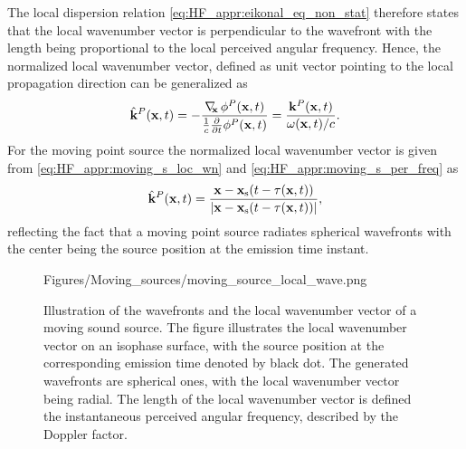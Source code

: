 The local dispersion relation \eqref{eq:HF_appr:eikonal_eq_non_stat} therefore states that the local wavenumber vector is perpendicular to the wavefront with the length being proportional to the local perceived angular frequency.
Hence, the normalized local wavenumber vector, defined as unit vector pointing to the local propagation direction can be generalized as
\begin{equation}
\label{eq:Moving_source:local_wn_general}
\hat{\mathbf{k}}^P(\mathbf{x},t) = -\frac{\nabla_{\!\!\mathbf{x}}\, \phi^P(\mathbf{x},t)}{\frac{1}{c}\frac{\partial}{\partial t} \phi^P(\mathbf{x},t)}  = \frac{\mathbf{k}^P(\mathbf{x},t)}{ \omega(\mathbf{x},t)/c }.
\end{equation}
For the moving point source the normalized local wavenumber vector is given from \eqref{eq:HF_appr:moving_s_loc_wn} and \eqref{eq:HF_appr:moving_s_per_freq} as
\begin{equation}
\label{eq:Moving_source:norm_local_wn_moving_source}
\hat{\mathbf{k}}^P(\mathbf{x},t) = \frac{\mathbf{x} -\mathbf{x}_{\mathrm{s}}(t-\tau(\mathbf{x},t))}{|\mathbf{x}-\mathbf{x}_{\mathrm{s}}(t-\tau(\mathbf{x},t))|},
\end{equation}
reflecting the fact that a moving point source radiates spherical wavefronts with the center being the source position at the emission time instant.
\begin{figure} 
	\small
    \begin{minipage}[c]{0.6\textwidth}
    \hspace{0cm}
	\begin{overpic}[width = 1.0\columnwidth ]{Figures/Moving_sources/moving_source_local_wave.png}
	\small
	\end{overpic} 
	\end{minipage}
	\hspace{10mm}
	\begin{minipage}[c]{0.35\textwidth}
    \caption{
	Illustration of the wavefronts and the local wavenumber vector of a moving sound source.
	The figure illustrates the local wavenumber vector on an isophase surface, with the source position at the corresponding emission time denoted by black dot.
	The generated wavefronts are spherical ones, with the local wavenumber vector being radial.
	The length of the local wavenumber vector is defined  the instantaneous perceived angular frequency, described by the Doppler factor.}
	\label{Fig:Moving_source:moving_source_local_wn}
	\end{minipage}
\end{figure}  

